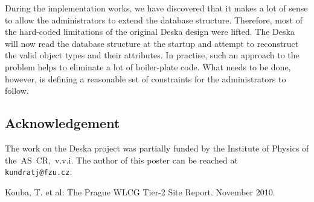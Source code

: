 \documentclass[11pt]{article}
\begin{document}
During the implementation works, we have discovered that it makes a lot of sense
to allow the administrators to extend the database structure.  Therefore, most
of the hard-coded limitations of the original Deska design were lifted.  The
Deska will now read the database structure at the startup and attempt to
reconstruct the valid object types and their attributes.  In practise, such an
approach to the problem helps to eliminate a lot of boiler-plate code.  What
needs to be done, however, is defining a reasonable set of constraints for the
administrators to follow.


\subsection{Acknowledgement}

The work on the Deska project was partially funded by the Institute of Physics
of the~AS~CR,~v.v.i.  The author of this poster can be reached at {\tt
kundratj@fzu.cz}.

\begin{thebibliography}{9}
    Kouba, T. et al: The Prague WLCG Tier-2 Site Report. November
        2010.
\end{thebibliography}
\end{document}
